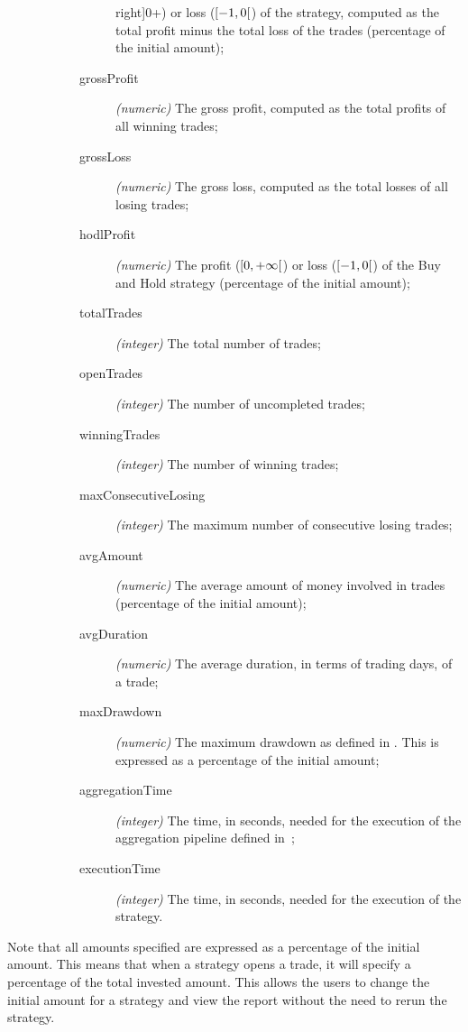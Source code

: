 \begin{description}
\begin{description}
\begin{description}
						right]{0}{+\infty}\)) or loss
						(\(\interval[open
						right]{-1}{0}\)) of the
						strategy, computed as the total
						profit minus the total loss of
						the trades (percentage of the
						initial amount);
					\item[grossProfit] \textit{(numeric)}
						The gross profit, computed as
						the total profits of all winning
						trades;
					\item[grossLoss] \textit{(numeric)} The
						gross loss, computed as the
						total losses of all losing
						trades;
					\item[hodlProfit] \textit{(numeric)} The
						profit (\(\interval[open
						right]{0}{+\infty}\)) or loss
						(\(\interval[open
						right]{-1}{0}\)) of the Buy and
						Hold strategy (percentage of the
						initial amount);
					\item[totalTrades] \textit{(integer)}
						The total number of trades;
					\item[openTrades] \textit{(integer)} The
						number of uncompleted trades;
					\item[winningTrades] \textit{(integer)}
						The number of winning trades;
					\item[maxConsecutiveLosing]
						\textit{(integer)} The maximum
						number of consecutive losing
						trades;
					\item[avgAmount] \textit{(numeric)} The
						average amount of money involved
						in trades (percentage of the
						initial amount);
					\item[avgDuration] \textit{(numeric)}
						The average duration, in terms
						of trading days, of a trade;
					\item[maxDrawdown] \textit{(numeric)}
						The maximum drawdown as defined
						in . This is
						expressed as a percentage of the
						initial amount;
					\item[aggregationTime]
						\textit{(integer)} The time, in
						seconds, needed for the
						execution of the aggregation
						pipeline defined
						in~;
					\item[executionTime] \textit{(integer)}
						The time, in seconds, needed for
						the execution of the strategy.
				\end{description}
		\end{description}
\end{description}

Note that all amounts specified are expressed as a percentage of the initial
amount. This means that when a strategy opens a trade, it will specify a
percentage of the total invested amount. This allows the users to change the
initial amount for a strategy and view the report without the need to rerun the
strategy.
